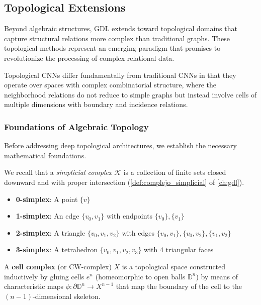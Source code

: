 \subsection{Topological Extensions}

Beyond algebraic structures, \gls{GDL} extends toward topological domains that capture structural relations more complex than traditional graphs. These topological methods represent an emerging paradigm that promises to revolutionize the processing of complex relational data.

Topological CNNs differ fundamentally from traditional CNNs in that they operate over spaces with complex combinatorial structure, where the neighborhood relations do not reduce to simple graphs but instead involve cells of multiple dimensions with boundary and incidence relations.

\subsubsection{Foundations of Algebraic Topology}

Before addressing deep topological architectures, we establish the necessary mathematical foundations.

We recall that a \textit{simplicial complex} $\mathcal{K}$ is a collection of finite sets closed downward and with proper intersection (\autoref{def:complejo_simplicial} of \autoref{ch:gdl}).\label{def:complejo_simplicial_cnn}

\begin{example}\label{ex:simplicios_bajos}
\leavevmode
\begin{itemize}
    \item \textbf{0-simplex}: A point $\{v\}$
    \item \textbf{1-simplex}: An edge $\{v_0, v_1\}$ with endpoints $\{v_0\}, \{v_1\}$
    \item \textbf{2-simplex}: A triangle $\{v_0, v_1, v_2\}$ with edges $\{v_0,v_1\}, \{v_0,v_2\}, \{v_1,v_2\}$
    \item \textbf{3-simplex}: A tetrahedron $\{v_0, v_1, v_2, v_3\}$ with 4 triangular faces
\end{itemize}
\end{example}

\begin{definition}\label{def:complejo_celular}
A \textbf{cell complex} (or CW-complex) $X$ is a topological space constructed inductively by gluing cells $e^n$ (homeomorphic to open balls $\mathbb{D}^n$) by means of characteristic maps $\phi: \partial \mathbb{D}^n \to X^{n-1}$ that map the boundary of the cell to the $(n-1)$-dimensional skeleton.
\end{definition}

